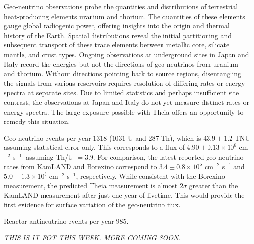 Geo-neutrino observations probe the quantities and distributions of terrestrial heat-producing elements uranium and thorium. The quantities of these elements gauge global radiogenic power, offering insights into the origin and thermal history of the Earth. Spatial distributions reveal the initial partitioning and subsequent transport of these trace elements between metallic core, silicate mantle, and crust types. Ongoing observations at underground sites in Japan and Italy record the energies but not the directions of geo-neutrinos from uranium and thorium. Without directions pointing back to source regions, disentangling the signals from various reservoirs requires resolution of differing rates or energy spectra at separate sites. Due to limited statistics and perhaps insufficient site contrast, the observations at Japan and Italy do not yet measure distinct rates or energy spectra. The large exposure possible with Theia offers an opportunity to remedy this situation.

Geo-neutrino events per year $1318$ ($1031$ U and $287$ Th), which is $43.9 \pm 1.2$ TNU assuming statistical error only. This corresponds to a flux of $4.90 \pm 0.13 \times 10^6$ cm$^{-2}$ s$^{-1}$, assuming Th/U $=3.9$. For comparison, the latest reported geo-neutrino rates from KamLAND and Borexino correspond to $3.4 \pm 0.8 \times 10^6$ cm$^{-2}$ s$^{-1}$ and $5.0 \pm 1.3 \times 10^6$ cm$^{-2}$ s$^{-1}$, respectively. While consistent with the Borexino measurement, the predicted Theia measurement is almost $2 \sigma$ greater than the KamLAND measurement after just one year of livetime. This would provide the first evidence for surface variation of the geo-neutrino flux.


Reactor antineutrino events per year $985$.

\it THIS IS IT FOT THIS WEEK. MORE COMING SOON.

